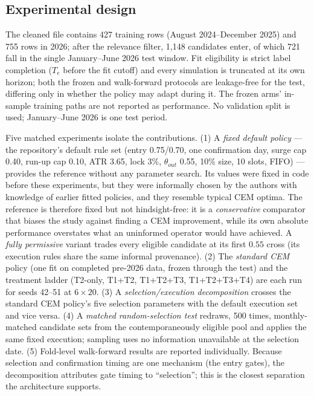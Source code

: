 \documentclass[sigconf,anonymous]{acmart}
\begin{document}
\subsection{Experimental design}
\label{sec:design}

The cleaned file contains 427 training rows (August 2024--December 2025) and 755 rows in 2026; after the relevance filter, 1,148 candidates enter, of which 721 fall in the single January--June 2026 test window. Fit eligibility is strict label completion ($T_e$ before the fit cutoff) and every simulation is truncated at its own horizon; both the frozen and walk-forward protocols are leakage-free for the test, differing only in whether the policy may adapt during it. The frozen arms' in-sample training paths are not reported as performance. No validation split is used; January--June 2026 is one test period.

Five matched experiments isolate the contributions. (1) A \emph{fixed default policy} --- the repository's default rule set (entry 0.75/0.70, one confirmation day, surge cap 0.40, run-up cap 0.10, ATR 3.65, lock 3\%, $\theta_{out}$ 0.55, 10\% size, 10 slots, FIFO) --- provides the reference without any parameter search. Its values were fixed in code before these experiments, but they were informally chosen by the authors with knowledge of earlier fitted policies, and they resemble typical CEM optima. The reference is therefore fixed but not hindsight-free: it is a \emph{conservative} comparator that biases the study against finding a CEM improvement, while its own absolute performance overstates what an uninformed operator would have achieved. A \emph{fully permissive} variant trades every eligible candidate at its first $0.55$ cross (its execution rules share the same informal provenance). (2) The \emph{standard CEM} policy (one fit on completed pre-2026 data, frozen through the test) and the treatment ladder (T2-only, T1+T2, T1+T2+T3, T1+T2+T3+T4) are each run for seeds 42--51 at $6\times20$. (3) A \emph{selection/execution decomposition} crosses the standard CEM policy's five selection parameters with the default execution set and vice versa. (4) A \emph{matched random-selection test} redraws, 500 times, monthly-matched candidate sets from the contemporaneously eligible pool and applies the same fixed execution; sampling uses no information unavailable at the selection date. (5) Fold-level walk-forward results are reported individually. Because selection and confirmation timing are one mechanism (the entry gates), the decomposition attributes gate timing to ``selection''; this is the closest separation the architecture supports.
\end{document}
